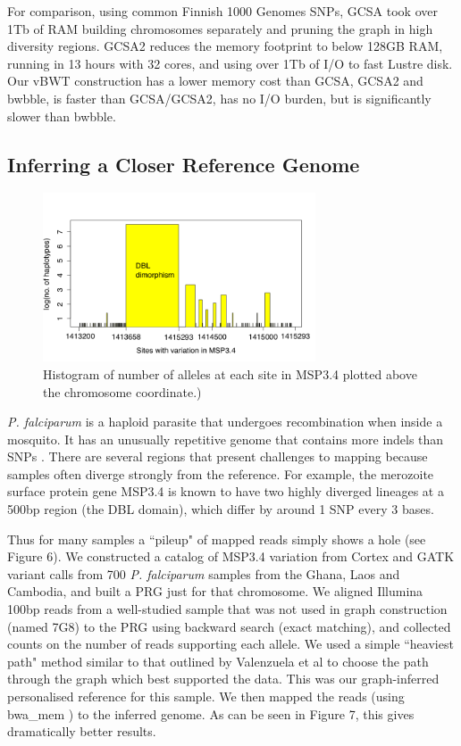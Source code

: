 \documentclass[runningheads,a4paper]{llncs}
\begin{document}
For comparison, using common Finnish 1000 Genomes SNPs, GCSA took over 1Tb of RAM building chromosomes separately and pruning the graph in high diversity regions. GCSA2 reduces the memory footprint to below 128GB RAM, running in 13 hours with 32 cores, and using  over 1Tb of I/O to fast Lustre disk.  Our vBWT construction has a lower  memory cost than GCSA, GCSA2 and bwbble,  is faster than GCSA/GCSA2, has no I/O burden, but is significantly slower than bwbble. 



\subsection{Inferring a Closer Reference Genome}

\begin{figure}
\centering
\includegraphics[height=5cm]{PRG.png}
\caption{Histogram of number of alleles at each site in MSP3.4 plotted above the chromosome coordinate.)}
\label{fig:example}
\end{figure}

\textit{P. falciparum} is a haploid parasite that undergoes recombination when inside a mosquito. It has an unusually  repetitive genome that contains more indels than SNPs \cite{miles}. There are several regions that present challenges to mapping because samples often diverge strongly from the reference. For example, the merozoite surface protein gene MSP3.4 is known to have two highly diverged lineages at a 500bp region (the DBL domain), which differ by around 1 SNP every 3 bases.




Thus for many samples a ``pileup" of mapped reads simply shows a hole (see Figure 6). We constructed a catalog of MSP3.4 variation from Cortex \cite{iqbal} and GATK \cite{depristo} variant calls from 700 \textit{P. falciparum} samples from the Ghana, Laos and Cambodia, and built a PRG just for that chromosome. We aligned Illumina 100bp reads from a well-studied sample that was not used in graph construction (named 7G8) to the PRG using backward search (exact matching), and collected counts on the number of reads supporting each allele. We used a simple ``heaviest path" method similar to that outlined by Valenzuela et al \cite{valen} to choose the path through the graph which best supported the data. This was our graph-inferred personalised reference for this sample. We then mapped the reads (using bwa\_mem \cite{hengli}) to the inferred genome. As can be seen in Figure 7,  this gives dramatically better results.
\end{document}
